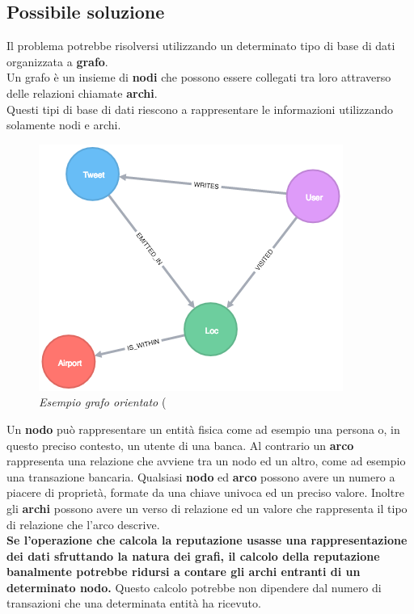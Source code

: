 \subsection{Possibile soluzione}
Il problema potrebbe risolversi utilizzando un determinato tipo di base di dati organizzata a \textbf{grafo}.\\
Un grafo è un insieme di \textbf{nodi} che possono essere collegati tra loro attraverso delle relazioni chiamate \textbf{archi}.\\
Questi tipi di base di dati riescono a rappresentare le informazioni utilizzando solamente nodi e archi.
\newpage
\begin{figure}[h!]
	\centering
	\includegraphics[scale=0.7]{immagini/grafo.png}
	\caption{\textit{Esempio grafo orientato} (}
\end{figure}
Un \textbf{nodo} può rappresentare un entità fisica come ad esempio una persona o, in questo preciso contesto, un utente di una banca. Al contrario un \textbf{arco} rappresenta una relazione che avviene tra un nodo ed un altro, come ad esempio una transazione bancaria. Qualsiasi \textbf{nodo} ed \textbf{arco} possono avere un numero a piacere di proprietà, formate da una chiave univoca ed un preciso valore. Inoltre gli \textbf{archi} possono avere un verso di relazione ed un valore che rappresenta il tipo di relazione che l'arco descrive.\\
\textbf{Se l'operazione che calcola la reputazione usasse una rappresentazione dei dati sfruttando la natura dei grafi, il calcolo della reputazione banalmente potrebbe ridursi a contare gli archi entranti di un determinato nodo.} Questo calcolo potrebbe non dipendere dal numero di transazioni che una determinata entità ha ricevuto.\\
